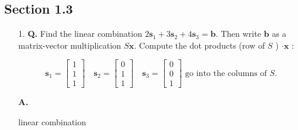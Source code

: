 \documentclass[main.tex]{subfiles}
\begin{document}
\subsection{Section 1.3}

    \begin{enumerate}
        \item [1.] \textbf{Q.} Find the linear combination $2 \bm{s}_{1}+3 \bm{s}_{2}+4 \bm{s}_{3}=\bm{b}$. Then write $\bm{b}$ as a matrix-vector multiplication $S \bm{x}$. Compute the dot products (row of $S$ ) $\cdot \bm{x}$ :
        
        $$
        \bm{s}_{1}=\left[\begin{array}{l}
        1 \\
        1 \\
        1
        \end{array}\right] \quad \bm{s}_{2}=\left[\begin{array}{l}
        0 \\
        1 \\
        1
        \end{array}\right] \quad \bm{s}_{3}=\left[\begin{array}{l}
        0 \\
        0 \\
        1
        \end{array}\right] \text { go into the columns of } S.
        $$
        
        \textbf{A.}
        
        linear combination
        

\end{enumerate}
\end{document}
